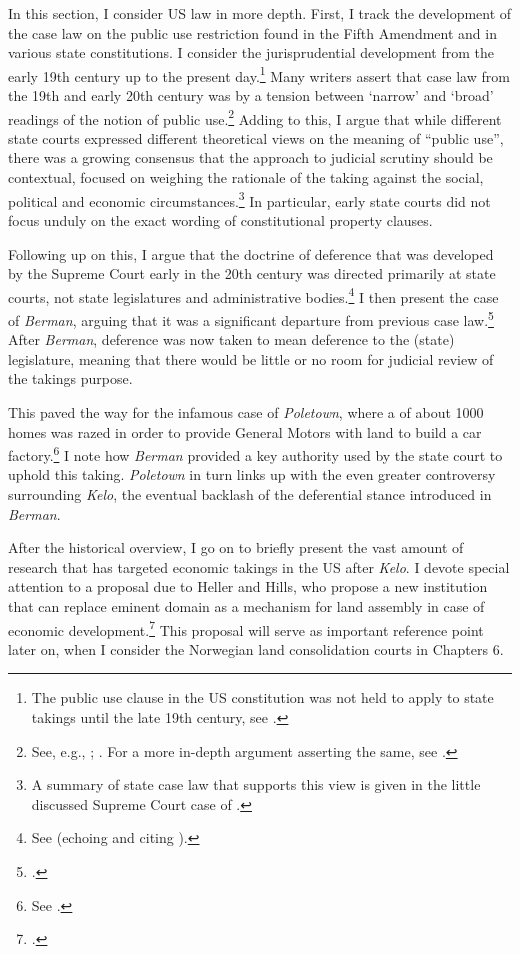 In this section, I consider US law in more depth. First, I track the development of the case law on the public use restriction found in the Fifth Amendment and in various state constitutions. I consider the jurisprudential development from the early 19th century up to the present day.\footnote{The public use clause in the US constitution was not held to apply to state takings until the late 19th century, see \cite{chicago97}.} Many writers assert that case law from the 19th and early 20th century was  by a tension between `narrow' and `broad' readings of the notion of public use.\footnote{See, e.g., \cite[483]{walt11}; \cite[203-204]{allen00}. For a more in-depth argument asserting the same, see \cite{nichols40}.} Adding to this, I argue that while different state courts expressed different theoretical views on the meaning of ``public use'', there was a growing consensus that the approach to judicial scrutiny should be contextual, focused on weighing the rationale of the taking against the social, political and economic circumstances.\footnote{A summary of state case law that supports this view is given in the little discussed Supreme Court case of \cite{hairston08}.}  In particular, early state courts did not focus unduly on the exact wording of constitutional property clauses.

Following up on this, I argue that the doctrine of deference that was developed by the Supreme Court early in the 20th century was directed primarily at state courts, not state legislatures and administrative bodies.\footnote{See \cite{vester30} (echoing and citing \cite{hairston08}).} I then present the case of {\it Berman}, arguing that it was a significant departure from previous case law.\footcite{berman54} After {\it Berman}, deference was now taken to mean deference to the (state) legislature, meaning that there would be little or no room for judicial review of the takings purpose. 

This paved the way for the infamous case of {\it Poletown}, where a  of about 1000 homes was razed in order to provide General Motors with land to build a car factory.\footnote{See \cite{poletown81}.} I note how {\it Berman} provided a key authority used by the state court to uphold this taking. {\it Poletown} in turn links up with the even greater controversy surrounding {\it Kelo},  the eventual backlash of the deferential stance introduced in {\it Berman}.

After the historical overview, I go on to briefly present the vast amount of research that has targeted economic takings in the US after {\it Kelo}. I devote special attention to a proposal due to Heller and Hills, who propose a new institution that can replace eminent domain as a mechanism for land assembly in case of economic development.\footcite{heller08} This proposal will serve as important reference point later on, when I consider the Norwegian land consolidation courts in Chapters 6.

